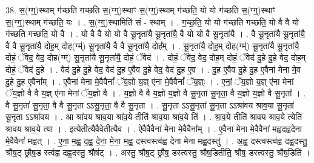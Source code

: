 \documentclass[17pt]{extarticle}
\begin{document}
38. स॒(ग्ग्॒)स्थाम् ग॑च्छति गच्छति स॒(ग्ग्॒)स्थाꣳ स॒(ग्ग्॒)स्थाम् ग॑च्छति॒ यो यो ग॑च्छति स॒(ग्ग्॒)स्थाꣳ स॒(ग्ग्॒)स्थाम् ग॑च्छति॒ यः । . स॒(ग्ग्॒)स्थामिति॑ सं - स्थाम् । . ग॒च्छ॒ति॒ यो यो ग॑च्छति गच्छति॒ यो वै वै यो ग॑च्छति गच्छति॒ यो वै । . यो वै वै यो यो वै सू॒नृता॑यै सू॒नृता॑यै॒ वै यो यो वै सू॒नृता॑यै । . वै सू॒नृता॑यै सू॒नृता॑यै॒ वै वै सू॒नृता॑यै॒ दोह॒म् दोह(ग्म्॑) सू॒नृता॑यै॒ वै वै सू॒नृता॑यै॒ दोह᳚म् । . सू॒नृता॑यै॒ दोह॒म् दोह(ग्म्॑) सू॒नृता॑यै सू॒नृता॑यै॒ दोहं॒ ॅवेद॒ वेद॒ दोह(ग्म्॑) सू॒नृता॑यै सू॒नृता॑यै॒ दोहं॒ ॅवेद॑ । . दोहं॒ ॅवेद॒ वेद॒ दोह॒म् दोहं॒ ॅवेद॑ दु॒हे दु॒हे वेद॒ दोह॒म् दोहं॒ ॅवेद॑ दु॒हे । . वेद॑ दु॒हे दु॒हे वेद॒ वेद॑ दु॒ह ए॒वैव दु॒हे वेद॒ वेद॑ दु॒ह ए॒व । . दु॒ह ए॒वैव दु॒हे दु॒ह ए॒वैना॑ मेना मे॒व दु॒हे दु॒ह ए॒वैना᳚म् । . ए॒वैना॑ मेना मे॒वैवैनां᳚ ॅय॒ज्ञो य॒ज्ञ् ए॑ना मे॒वैवैनां᳚ ॅय॒ज्ञ्ः । . ए॒नां॒ ॅय॒ज्ञो य॒ज्ञ् ए॑ना मेनां ॅय॒ज्ञो वै वै य॒ज्ञ् ए॑ना मेनां ॅय॒ज्ञो वै । . य॒ज्ञो वै वै य॒ज्ञो य॒ज्ञो वै सू॒नृता॑ सू॒नृता॒ वै य॒ज्ञो य॒ज्ञो वै सू॒नृता᳚ । . वै सू॒नृता॑ सू॒नृता॒ वै वै सू॒नृता ऽऽसू॒नृता॒ वै वै सू॒नृता । . सू॒नृता ऽऽसू॒नृता॑ सू॒नृता ऽऽश्रा॑वय श्राव॒या सू॒नृता॑ सू॒नृता ऽऽश्रा॑वय । . आ श्रा॑वय श्राव॒या श्रा॑व॒ये तीति॑ श्राव॒या श्रा॑व॒ये ति॑ । . श्रा॒व॒ये तीति॑ श्रावय श्राव॒ये त्येति॑ श्रावय श्राव॒ये त्या । . इत्येतीत्यैवैवेतीत्यैव । . ऐवैवैवैना॑ मेना मे॒वैवैना᳚म् । . ए॒वैना॑ मेना मे॒वैवैना॑ मह्वदह्वदेना मे॒वैवैना॑ मह्वत् । . ए॒ना॒ म॒ह्व॒ द॒ह्व॒ दे॒ना॒ मे॒ना॒ म॒ह्व॒ दस्त्वस्त्व॑ह्व देना मेना मह्व॒दस्तु॑ । . अ॒ह्व॒ दस्त्वस्त्व॑ह्व दह्व॒दस्तु॒ श्रौष॒ट् छ्रौष॒ड स्त्व॑ह्व दह्व॒दस्तु॒ श्रौष॑ट् । . अस्तु॒ श्रौष॒ट् छ्रौष॒ डस्त्वस्तु॒ श्रौष॒डितीति॒ श्रौष॒ डस्त्वस्तु॒ श्रौष॒डिति॑ । \newline
\pagebreak
{}
\end{document}
